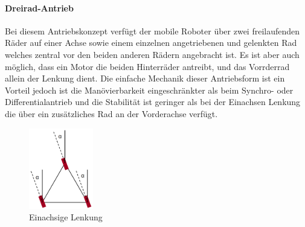 \paragraph{Dreirad-Antrieb}
\color{process}
Bei diesem Antriebskonzept verfügt der mobile Roboter über zwei freilaufenden Räder auf einer Achse sowie einem einzelnen angetriebenen und gelenkten Rad welches zentral vor den beiden anderen Rädern angebracht ist. Es ist aber auch möglich, dass ein Motor die beiden Hinterräder
antreibt, und das Vorrderrad allein der Lenkung dient.
\newline
Die einfache Mechanik dieser Antriebsform ist ein Vorteil jedoch ist die Manövierbarkeit eingeschränkter als beim Synchro- oder Differentialantrieb und die Stabilität ist geringer als bei der Einachsen Lenkung die über ein zusätzliches Rad an der Vorderachse verfügt.
\begin{figure}
	\vspace{-0.8cm}
	\begin{center}
		\includegraphics[width=0.25\textwidth]{images/technische_grundlagen/Synchroantrieb.png}
	\end{center}
	\caption{Einachsige Lenkung}
	\label{fig:einachsenlenkung}
\end{figure}
